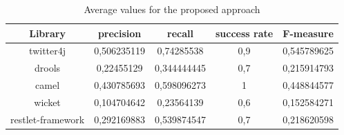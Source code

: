 \begin{table}[!h]
  \caption{ Average values for the proposed approach }
  \label{Table:8}
 \begin{center}
\begin{tabular}{|c|c|c|c|c|}

\hline
 \textbf{Library} & \textbf{precision}  & \textbf{recall} & \textbf{success rate} & \textbf{F-measure} \\ 
\hline
 twitter4j &  0,506235119 & 0,74285538 &  0,9 & 0,545789625 \\
\hline
drools & 0,22455129 &   0,344444445 & 0,7 & 0,215914793\\
\hline
camel & 0,430785693  & 0,598096273 & 1 & 0,448844577 \\
\hline 
wicket & 0,104704642 & 0,23564139 & 0,6 & 0,152584271 \\
\hline
restlet-framework &  0,292169883 &  0,539874547 & 0,7 & 0,218620598  \\
\hline
\end{tabular}
\end{center}
\end{table} 


